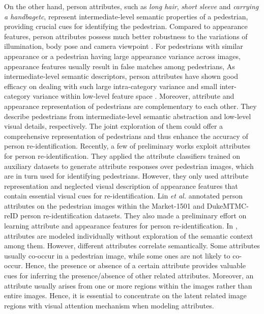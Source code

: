 \documentclass[sigconf]{acmart}
\begin{document}
On the other hand, person attributes, such as \textit{long hair}, \textit{short sleeve} and \textit{carrying a handbag}\textit{etc}, represent intermediate-level semantic properties of a pedestrian, providing crucial cues for identifying the pedestrian. Compared to appearance features, person attributes possess much better robustness to the variations of illumination, body pose and camera viewpoint \cite{12}. For pedestrians with similar appearance or a pedestrian having large appearance variance across images, appearance features usually result in false matches among pedestrians, As intermediate-level semantic descriptors, person attributes have shown good efficacy on dealing with such large intra-category variance and small inter-category variance within low-level feature space \cite{58,57}. Moreover, attribute and appearance representation of pedestrians are complementary to each other. They describe pedestrians from intermediate-level semantic abstraction and low-level visual details, respectively. The joint exploration of them could offer a comprehensive representation of pedestrians and thus enhance the accuracy of person re-identification. Recently, a few of preliminary works \cite{9,10,11} exploit attributes for person re-identification. They applied the attribute classifiers trained on auxiliary datasets to generate attribute responses over pedestrian images, which are in turn used for identifying pedestrians. However, they only used attribute representation and neglected visual description of appearance features that contain essential visual cues for re-identification. Lin \textit{et al.}\cite{12} annotated person attributes on the pedestrian images within the Market-1501 and DukeMTMC-reID person re-identification datasets. They also made a preliminary effort on learning attribute and appearance features for person re-identification. In \cite{12}, attributes are modeled individually without exploration of the semantic context among them. However, different attributes correlate semantically. Some attributes usually co-occur in a pedestrian image, while some ones are not likely to co-occur. Hence, the presence or absence of a certain attribute provides valuable cues for inferring the presence/absence of other related attributes. Moreover, an attribute usually arises from one or more regions within the images rather than entire images. Hence, it is essential to concentrate on the latent related image regions with visual attention mechanism when modeling attributes.
\end{document}
